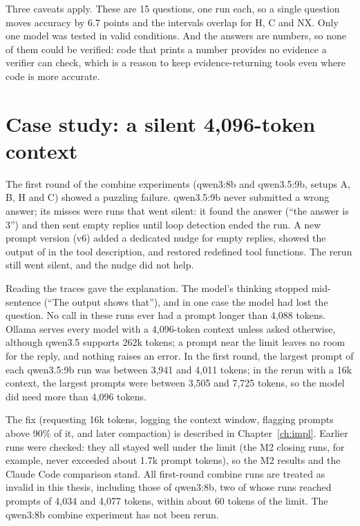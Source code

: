Three caveats apply. These are 15 questions, one run each, so a single question moves accuracy by 6.7 points and the
intervals overlap for H, C and NX. Only one model was tested in valid conditions. And the answers are numbers, so none
of them could be verified: code that prints a number provides no evidence a verifier can check, which is a reason to
keep evidence-returning tools even where code is more accurate.

\section{Case study: a silent 4,096-token context}
\label{sec:case-4k}

The first round of the combine experiments (qwen3:8b and qwen3.5:9b, setups A, B, H and C) showed a puzzling failure.
qwen3.5:9b never submitted a wrong answer; its misses were runs that went silent: it found the answer (``the answer is
3'') and then sent empty replies until loop detection ended the run. A new prompt version (v6) added a dedicated nudge
for empty replies, showed the output of  in the tool description, and restored redefined tool
functions. The rerun still went silent, and the nudge did not help.

Reading the traces gave the explanation. The model's thinking stopped mid-sentence (``The output shows that''), and in
one case the model had lost the question. No call in these runs ever had a prompt longer than 4,088 tokens. Ollama
serves every model with a 4,096-token context unless asked otherwise, although qwen3.5 supports 262k tokens; a prompt
near the limit leaves no room for the reply, and nothing raises an error. In the first round, the largest prompt of
each qwen3.5:9b run was between 3,941 and 4,011 tokens; in the rerun with a 16k context, the largest prompts were
between 3,505 and 7,725 tokens, so the model did need more than 4,096 tokens.

The fix (requesting 16k tokens, logging the context window, flagging prompts above 90\% of it, and later compaction)
is described in Chapter~\ref{ch:impl}. Earlier runs were checked: they all stayed well under the limit (the M2 closing
runs, for example, never exceeded about 1.7k prompt tokens), so the M2 results and the Claude Code comparison stand.
All first-round combine runs are treated as invalid in this thesis, including those of qwen3:8b, two of whose runs
reached prompts of 4,034 and 4,077 tokens, within about 60 tokens of the limit. The qwen3:8b combine experiment has not been rerun.

